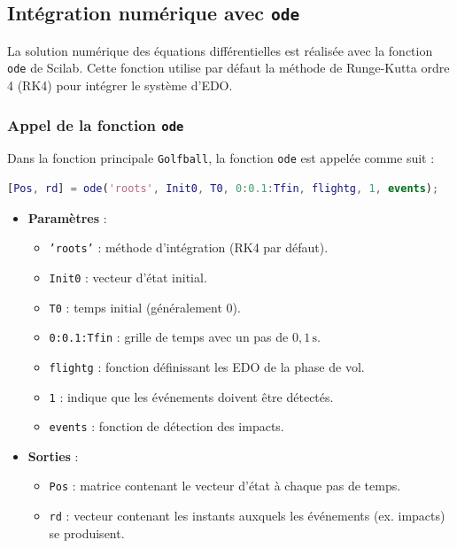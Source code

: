 \documentclass[10pt,a4paper]{report}
\begin{document}
\bigskip
\subsection{Intégration numérique avec \texttt{ode}}
\label{subsec:numerical_integration}

La solution numérique des équations différentielles est réalisée avec la fonction \texttt{ode} de Scilab. Cette fonction utilise par défaut la méthode de Runge-Kutta ordre 4 (RK4) pour intégrer le système d'EDO.

\subsubsection{Appel de la fonction \texttt{ode}}
Dans la fonction principale \texttt{Golfball}, la fonction \texttt{ode} est appelée comme suit :

\begin{lstlisting}[language=Matlab, caption={Appel de la fonction \texttt{ode} pour la phase de vol}, label=lst:ode_call]
[Pos, rd] = ode('roots', Init0, T0, 0:0.1:Tfin, flightg, 1, events);
\end{lstlisting}

\begin{itemize}
    \item \textbf{Paramètres} :
    \begin{itemize}
        \item \texttt{'roots'} : méthode d'intégration (RK4 par défaut).
        \item \texttt{Init0} : vecteur d'état initial.
        \item \texttt{T0} : temps initial (généralement \(0\)).
        \item \texttt{0:0.1:Tfin} : grille de temps avec un pas de \(0{,}1 \, \text{s}\).
        \item \texttt{flightg} : fonction définissant les EDO de la phase de vol.
        \item \texttt{1} : indique que les événements doivent être détectés.
        \item \texttt{events} : fonction de détection des impacts.
    \end{itemize}
    \item \textbf{Sorties} :
    \begin{itemize}
        \item \texttt{Pos} : matrice contenant le vecteur d'état à chaque pas de temps.
        \item \texttt{rd} : vecteur contenant les instants auxquels les événements (ex. impacts) se produisent.
    \end{itemize}
\end{itemize}
\end{document}
